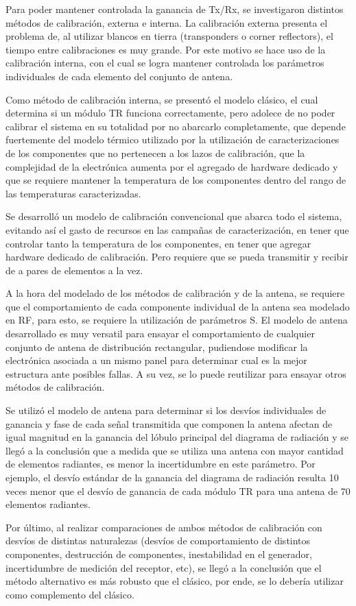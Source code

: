 Para poder mantener controlada la ganancia de Tx/Rx, se investigaron distintos métodos de calibración, externa e interna. La 
calibración externa presenta el problema de, al utilizar blancos en tierra (transponders o corner reflectors), el tiempo entre 
calibraciones es muy grande. Por este motivo se hace uso de la calibración interna, con el cual se logra mantener controlada 
los parámetros individuales de cada elemento del conjunto de antena. 

Como método de calibración interna, se presentó el modelo clásico, el cual determina si un módulo TR funciona correctamente, 
pero adolece de no poder calibrar el sistema en su totalidad por no abarcarlo completamente, que depende 
fuertemente del modelo térmico utilizado por la utilización de caracterizaciones de los componentes que no pertenecen a los 
lazos de calibración, que la complejidad de la electrónica aumenta por el agregado de hardware dedicado y que se requiere 
mantener la temperatura de los componentes dentro del rango de las temperaturas caracterizadas.

Se desarrolló un modelo de calibración convencional que abarca todo el sistema, evitando así el gasto de recursos en las 
campañas de caracterización, en tener que controlar tanto la temperatura de los componentes, en tener que agregar hardware 
dedicado de calibración. Pero requiere que se pueda transmitir y recibir de a pares de elementos a la vez. 

A la hora del modelado de los métodos de calibración y de la antena, se requiere que el comportamiento de cada componente 
individual de la antena sea modelado en RF, para esto, se requiere la utilización de parámetros S. El modelo de antena 
desarrollado es muy versatil para ensayar el comportamiento de cualquier conjunto de antena de distribución rectangular, 
pudiendose modificar la electrónica asociada a un mismo panel para determinar cual es la mejor estructura ante posibles fallas.
A su vez, se lo puede reutilizar para ensayar otros métodos de calibración.

Se utilizó el modelo de antena para determinar si los desvíos individuales de ganancia y fase de cada señal transmitida que 
componen la antena afectan de igual magnitud en la ganancia del lóbulo principal del diagrama de radiación y se llegó a la 
conclusión que a medida que se utiliza una antena con mayor cantidad de elementos radiantes, es menor la incertidumbre en este 
parámetro. Por ejemplo, el desvío estándar de la ganancia del diagrama de radiación resulta 10 veces menor que el desvío de 
ganancia de cada módulo TR para una antena de 70 elementos radiantes.

Por último, al realizar comparaciones de ambos métodos de calibración con desvíos de distintas naturalezas (desvíos de 
comportamiento de distintos componentes, destrucción de componentes, inestabilidad en el generador, incertidumbre de medición 
del receptor, etc), se llegó a la conclusión que el método alternativo es más robusto que el clásico, por ende, se lo 
debería utilizar como complemento del clásico.

